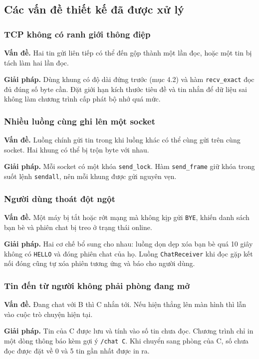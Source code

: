 \documentclass[a4paper,12pt]{article}
\newcommand{\code}[1]{\texttt{#1}}
\begin{document}
\subsection{Các vấn đề thiết kế đã được xử lý}

\subsubsection{TCP không có ranh giới thông điệp}
\textbf{Vấn đề.} Hai tin gửi liên tiếp có thể đến gộp thành một lần đọc, hoặc một tin bị tách làm hai lần đọc.

\textbf{Giải pháp.} Dùng khung có độ dài đứng trước (mục 4.2) và hàm \code{recv\_exact} đọc đủ đúng số byte cần. Đặt giới hạn kích thước tiêu đề và tin nhắn để dữ liệu sai không làm chương trình cấp phát bộ nhớ quá mức.

\subsubsection{Nhiều luồng cùng ghi lên một socket}
\textbf{Vấn đề.} Luồng chính gửi tin trong khi luồng khác có thể cùng gửi trên cùng socket. Hai khung có thể bị trộn byte với nhau.

\textbf{Giải pháp.} Mỗi socket có một khóa \code{send\_lock}. Hàm \code{send\_frame} giữ khóa trong suốt lệnh \code{sendall}, nên mỗi khung được gửi nguyên vẹn.

\subsubsection{Người dùng thoát đột ngột}
\textbf{Vấn đề.} Một máy bị tắt hoặc rớt mạng mà không kịp gửi \code{BYE}, khiến danh sách bạn bè và phiên chat bị treo ở trạng thái online.

\textbf{Giải pháp.} Hai cơ chế bổ sung cho nhau: luồng dọn dẹp xóa bạn bè quá 10 giây không có \code{HELLO} và đóng phiên chat của họ. Luồng \code{ChatReceiver} khi đọc gặp kết nối đóng cũng tự xóa phiên tương ứng và báo cho người dùng.

\subsubsection{Tin đến từ người không phải phòng đang mở}
\textbf{Vấn đề.} Đang chat với B thì C nhắn tới. Nếu hiện thẳng lên màn hình thì lẫn vào cuộc trò chuyện hiện tại.

\textbf{Giải pháp.} Tin của C được lưu và tính vào số tin chưa đọc. Chương trình chỉ in một dòng thông báo kèm gợi ý \code{/chat C}. Khi chuyển sang phòng của C, số chưa đọc được đặt về 0 và 5 tin gần nhất được in ra.
\end{document}
